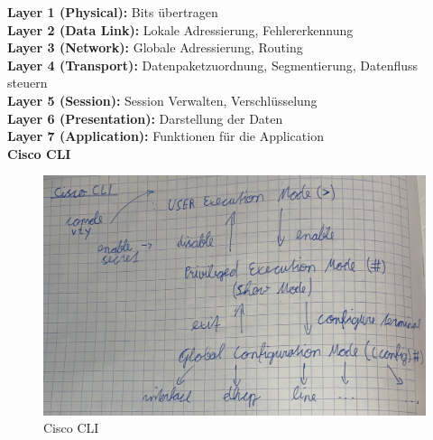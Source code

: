 \textbf{Layer 1 (Physical):} Bits übertragen \\
\textbf{Layer 2 (Data Link):} Lokale Adressierung, Fehlererkennung \\
\textbf{Layer 3 (Network):} Globale Adressierung, Routing \\
\textbf{Layer 4 (Transport):} Datenpaketzuordnung, Segmentierung, Datenfluss steuern \\
\textbf{Layer 5 (Session):} Session Verwalten, Verschlüsselung \\
\textbf{Layer 6 (Presentation):} Darstellung der Daten \\
\textbf{Layer 7 (Application):} Funktionen für die Application \\

\textbf{Cisco CLI}
\begin{figure}[H]
	\centering
	\includegraphics[width=0.9\linewidth]{figures/ciscocli.jpeg}
	\caption{Cisco CLI}
	\label{fig:ciscocli}
\end{figure}